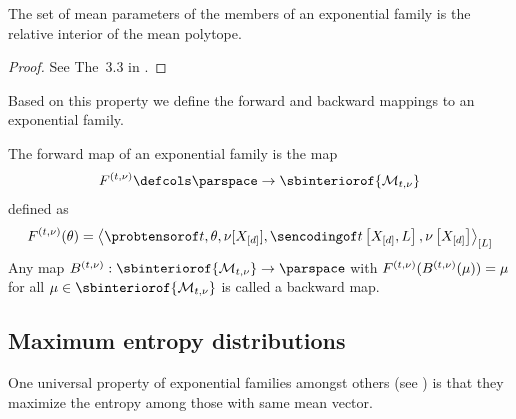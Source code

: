 \begin{lemma}
    \label{lem:interiorRepExpFamily}
    The set of mean parameters of the members of an exponential family is the relative interior of the mean polytope.
\end{lemma}
\begin{proof}
    See The~3.3 in \cite{wainwright_graphical_2008}.
\end{proof}

Based on this property we define the forward and backward mappings to an exponential family.

\begin{definition}\label{def:forwardBackwardMapping}
    The forward map of an exponential family is the map
    \begin{align*}
        \forwardmap  \defcols \parspace \rightarrow \sbinteriorof{\genmeanset}
    \end{align*}
    defined as
    \begin{align*}
        \forwardmapof{\canparam}
        = \contractionof{\expdistofat{\sstat,\canparam,\basemeasure}{\shortcatvariables},\sencsstatwith,\basemeasurewith}{\selvariable}
    \end{align*}
    Any map $\backwardmap: \sbinteriorof{\genmeanset}\rightarrow \parspace$ with $F^{(t,\nu)}(B^{(t,\nu)}(\mu))=\mu$ for all $\meanparam\in\sbinteriorof{\genmeanset}$ is called a backward map.
\end{definition}

\subsection{Maximum entropy distributions}

One universal property of exponential families amongst others (see \cite{murphy_probabilistic_2023}) is that they maximize the entropy among those with same mean vector.

